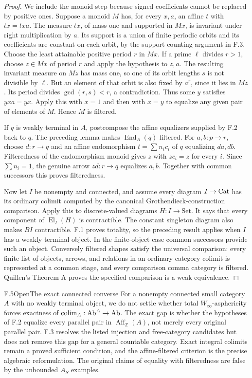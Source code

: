 \begin{proof}
We include the monoid step because signed coefficients cannot be replaced by positive ones. Suppose a monoid $M$ has, for every $x,a$, an affine $t$ with $tx=txa$. The measure $tx$, of mass one and supported in $Mx$, is invariant under right multiplication by $a$. Its support is a union of finite periodic orbits and its coefficients are constant on each orbit, by the support-counting argument in F.3. Choose the least attainable positive period $r$ in $Mx$. If a prime $\ell$ divides $r>1$, choose $z\in Mx$ of period $r$ and apply the hypothesis to $z,a$. The resulting invariant measure on $Mz$ has mass one, so one of its orbit lengths $s$ is not divisible by $\ell$. But an element of that orbit is also fixed by $a^r$, since it lies in $Mz$. Its period divides $\gcd(r,s)<r$, a contradiction. Thus some $y$ satisfies $yxa=yx$. Apply this with $x=1$ and then with $x=y$ to equalize any given pair of elements of $M$. Hence $M$ is filtered.

If $q$ is weakly terminal in $A$, postcompose the affine equalizers supplied by F.2 back to $q$. The preceding lemma makes $\operatorname{End}_A(q)$ filtered. For $a,b:p\to r$, choose $d:r\to q$ and an affine endomorphism $t=\sum n_ic_i$ of $q$ equalizing $da,db$. Filteredness of the endomorphism monoid gives $z$ with $zc_i=z$ for every $i$. Since $\sum n_i=1$, the genuine arrow $zd:r\to q$ equalizes $a,b$. Together with common successors this proves filteredness.

Now let $I$ be nonempty and connected, and assume every diagram $I\to\mathrm{Cat}$ has its ordinary colimit computed by the canonical Grothendieck-construction comparison. Apply this to discrete-valued diagrams $H:I\to\mathrm{Set}$. It says that every component of $\operatorname{El}_I(H)$ is contractible. The constant singleton diagram also makes $BI$ contractible. F.1 proves totality, so the preceding result applies when $I$ has a weakly terminal object. In the finite-object case common successors provide such an object. Conversely filtered shapes satisfy the universal comparison: every finite list of objects, arrows, and relations in an ordinary category colimit is represented at a common stage, and every comparison comma category is filtered. Quillen's Theorem A proves the specified comparison is a weak equivalence.
\end{proof}

\begin{claim}{F.5}{Open}{The exact connected converse}
For a nonempty connected small category $A$ with no weakly terminal object, we do not settle whether total $W_\infty$-asphericity forces exactness of $\operatorname{colim}_A:\mathrm{Ab}^A\to\mathrm{Ab}$. The exact gap is whether the hypotheses of F.2 equalize every parallel pair in $\operatorname{Aff}_{\mathbb Z}(A)$, not merely every original parallel pair. F.3 resolves the listed injection and free-category candidates but does not remove this gap for a general countable category. Exact integral colimits remain a proved sufficient condition, and the affine-filtered criterion is the precise algebraic reformulation. The original claims of equality with filteredness are false by the unbounded $A_S$ examples.
\end{claim}

